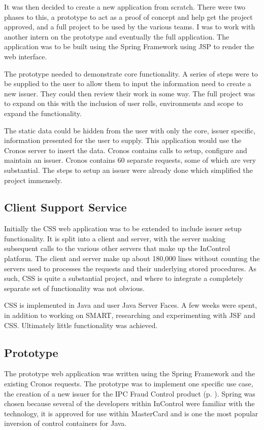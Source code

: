 \documentclass[a4paper, 11pt, titlepage]{article}
\begin{document}
It was then decided to create a new application from scratch. There were two phases to this, a prototype to act as a proof of concept and help get the project approved, and a full project to be used by the various teams. I was to work with another intern on the prototype and eventually the full application. The application was to be built using the Spring Framework using JSP to render the web interface. 
 
The prototype needed to demonstrate core functionality. A series of steps were to be supplied to the user to allow them to input the information need to create a new issuer. They could then review their work in some way. The full project was to expand on this with the inclusion of user rolls, environments and scope to expand the functionality.  

The static data could be hidden from the user with only the core, issuer specific, information presented for the user to supply. This application would use the Cronos server to insert the data. Cronos contains calls to setup, configure and maintain an issuer. Cronos contains 60 separate requests, some of which are very substantial. The steps to setup an issuer were already done which simplified the project immensely. 


\subsection{Client Support Service} 
\label{CSS}
 
Initially the CSS web application was to be extended to include issuer setup functionality. It is split into a client and server, with the server making subsequent calls to the various other servers that make up the InControl platform. The client and server make up about 180,000 lines without counting the servers used to processes the requests and their underlying stored procedures. As such, CSS is quite a substantial project, and where to integrate a completely separate set of functionality was not obvious.

CSS is implemented in Java and user Java Server Faces. A few weeks were spent, in addition to working on SMART, researching and experimenting with JSF and CSS. Ultimately little functionality was achieved.
 
\subsection{Prototype} 
 
The prototype web application was written using the Spring Framework \cite{Spring} and the existing Cronos requests. The prototype was to implement one specific use case, the creation of a new issuer for the IPC Fraud Control product  (p. \pageref{fraud_control}).
Spring was chosen because several of the developers within InControl were familiar with the technology, it is approved for use within MasterCard and is one the most popular inversion of control containers for Java. 
\end{document}
